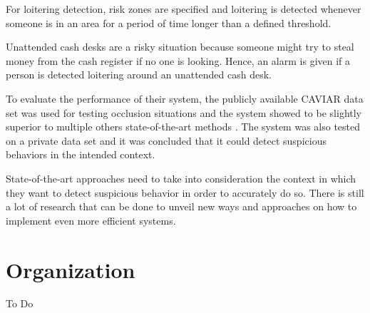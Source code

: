 For loitering detection, risk zones are specified and loitering is detected whenever someone is in an area for a period of time longer than a defined threshold.

Unattended cash desks are a risky situation because someone might try to steal money from the cash register if no one is looking. Hence, an alarm is given if a person is detected loitering around an unattended cash desk.

To evaluate the performance of their system, the publicly available CAVIAR data set was used for testing occlusion situations and the system showed to be slightly superior to multiple others state-of-the-art methods \cite{n13,n14,n15}. The system was also tested on a private data set and it was concluded that it could detect suspicious behaviors in the intended context.

State-of-the-art approaches need to take into consideration the context in which they want to detect suspicious behavior in order to accurately do so. There is still a lot of research that can be done to unveil new ways and approaches on how to implement even more efficient systems.


\section{Organization}
To Do


